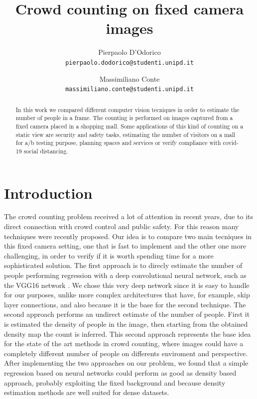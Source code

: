 \documentclass[10pt,twocolumn,letterpaper]{article}
\begin{document}
\title{Crowd counting on fixed camera images}

\author{Pierpaolo D'Odorico\\
{\tt\small pierpaolo.dodorico@studenti.unipd.it}
\and
Massimiliano Conte\\
{\tt\small massimiliano.conte@studenti.unipd.it}
}


\maketitle
\begin{abstract}



In this work we compared different computer vision tecniques in order to estimate the number of people in a frame. The counting is performed on images captured from a fixed camera placed in a shopping mall. Some applications of this kind of counting on a static view are security and safety tasks, estimating the number of visitors on a mall for a/b testing purpose, planning spaces and services or verify compliance with covid-19 social distancing.

\end{abstract}

\section{Introduction}

The crowd counting problem received a lot of attention in recent years, due to its direct connection with crowd control and public safety. For this reason many techniques were recently proposed.
Our idea is to compare two main tecniques in this fixed camera setting, one that is fast to implement and the other one more challenging, in order to verify if it is worth spending time for a more sophisticated solution. The first approach is to direcly estimate the number of people performing regression with a deep convolutional neural network, such as the VGG16 network \cite{simonyan2014very}. We chose this very deep network since it is easy to handle for our purposes, unlike more complex architectures that have, for example, skip layer connections, and also because it is the base for the second technique. The second approach performs an undirect estimate of the number of people. First it is estimated the density of people in the image, then starting from the obtained density map the count is inferred. This second approach represents the base idea for the state of the art methods in crowd counting, where images could have a completely different number of people on  differents enviroment and perspective. After implementing the two approaches on our problem, we found that a simple regression based on neural networks could perform as good as density based approach, probably exploiting the fixed background and because density estimation methods are well suited for dense datasets.
\end{document}
